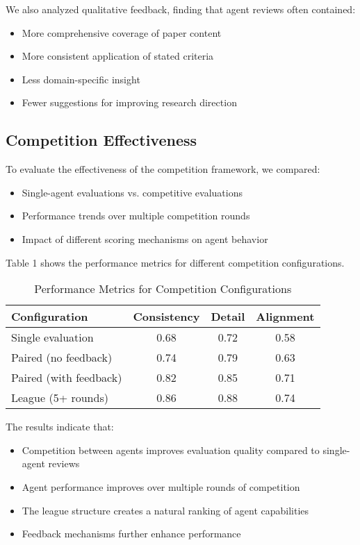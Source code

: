 \documentclass[conference]{IEEEtran}
\begin{document}
We also analyzed qualitative feedback, finding that agent reviews often contained:

\begin{itemize}
    \item More comprehensive coverage of paper content
    \item More consistent application of stated criteria
    \item Less domain-specific insight
    \item Fewer suggestions for improving research direction
\end{itemize}

\subsection{Competition Effectiveness}
To evaluate the effectiveness of the competition framework, we compared:

\begin{itemize}
    \item Single-agent evaluations vs. competitive evaluations
    \item Performance trends over multiple competition rounds
    \item Impact of different scoring mechanisms on agent behavior
\end{itemize}

Table 1 shows the performance metrics for different competition configurations.

\begin{table}[h]
\caption{Performance Metrics for Competition Configurations}
\centering
\begin{tabular}{|l|c|c|c|}
\hline
\textbf{Configuration} & \textbf{Consistency} & \textbf{Detail} & \textbf{Alignment} \\
\hline
Single evaluation & 0.68 & 0.72 & 0.58 \\
\hline
Paired (no feedback) & 0.74 & 0.79 & 0.63 \\
\hline
Paired (with feedback) & 0.82 & 0.85 & 0.71 \\
\hline
League (5+ rounds) & 0.86 & 0.88 & 0.74 \\
\hline
\end{tabular}
\end{table}

The results indicate that:

\begin{itemize}
    \item Competition between agents improves evaluation quality compared to single-agent reviews
    \item Agent performance improves over multiple rounds of competition
    \item The league structure creates a natural ranking of agent capabilities
    \item Feedback mechanisms further enhance performance
\end{itemize}
\end{document}
